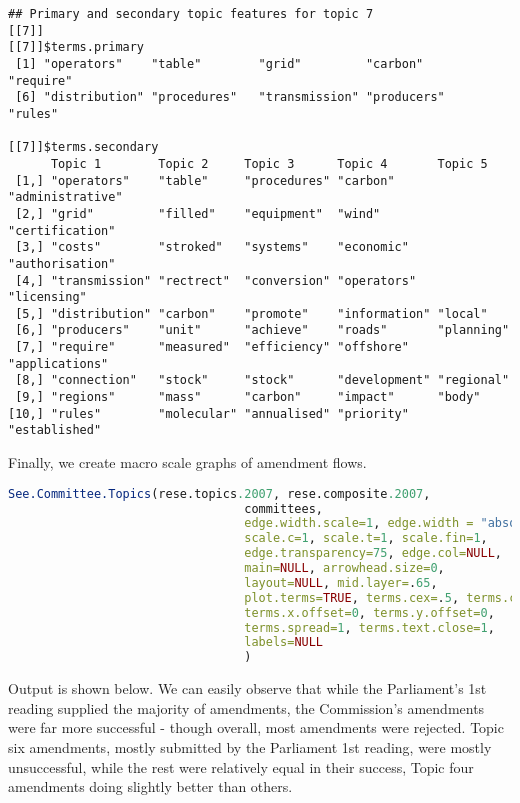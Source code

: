 \documentclass[11pt]{article}
\begin{document}
\begin{verbatim}
## Primary and secondary topic features for topic 7 
[[7]]
[[7]]$terms.primary
 [1] "operators"    "table"        "grid"         "carbon"       "require"     
 [6] "distribution" "procedures"   "transmission" "producers"    "rules"       

[[7]]$terms.secondary
      Topic 1        Topic 2     Topic 3      Topic 4       Topic 5         
 [1,] "operators"    "table"     "procedures" "carbon"      "administrative"
 [2,] "grid"         "filled"    "equipment"  "wind"        "certification" 
 [3,] "costs"        "stroked"   "systems"    "economic"    "authorisation" 
 [4,] "transmission" "rectrect"  "conversion" "operators"   "licensing"     
 [5,] "distribution" "carbon"    "promote"    "information" "local"         
 [6,] "producers"    "unit"      "achieve"    "roads"       "planning"      
 [7,] "require"      "measured"  "efficiency" "offshore"    "applications"  
 [8,] "connection"   "stock"     "stock"      "development" "regional"      
 [9,] "regions"      "mass"      "carbon"     "impact"      "body"          
[10,] "rules"        "molecular" "annualised" "priority"    "established" 
\end{verbatim}

Finally, we create macro scale graphs of amendment flows.

\begin{lstlisting}[language=R, numbers=none]
See.Committee.Topics(rese.topics.2007, rese.composite.2007,
                                 committees,
                                 edge.width.scale=1, edge.width = "absolute",
                                 scale.c=1, scale.t=1, scale.fin=1,
                                 edge.transparency=75, edge.col=NULL,
                                 main=NULL, arrowhead.size=0, 
                                 layout=NULL, mid.layer=.65, 
                                 plot.terms=TRUE, terms.cex=.5, terms.col="grey20",
                                 terms.x.offset=0, terms.y.offset=0, 
                                 terms.spread=1, terms.text.close=1,
                                 labels=NULL
                                 )
\end{lstlisting}

Output is shown below. We can easily observe that while the Parliament's 1st reading supplied the majority of amendments, the Commission's amendments were far more successful - though overall, most amendments were rejected. Topic six amendments, mostly submitted by the Parliament 1st reading, were mostly unsuccessful, while the rest were relatively equal in their success, Topic four amendments doing slightly better than others.
\end{document}
